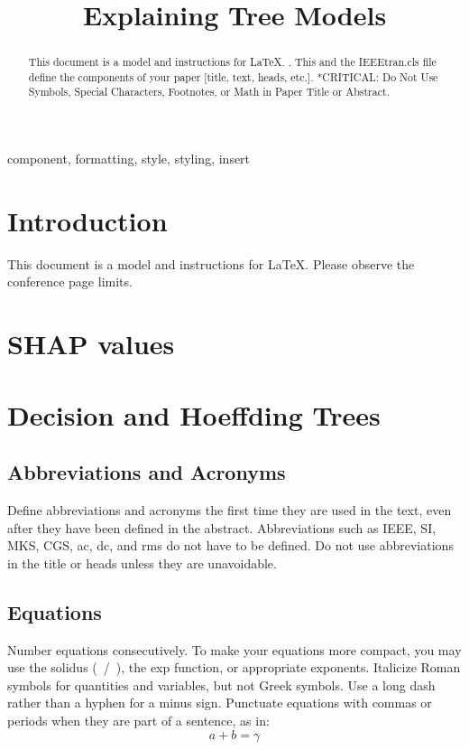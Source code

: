 \documentclass[conference]{IEEEtran}
\begin{document}
\title{Explaining Tree Models}

\author{
}

\maketitle

\begin{abstract}
This document is a model and instructions for \LaTeX.
\cite{b1}. This \cite{b2} and \cite{b3} the IEEEtran.cls file define the components of your paper [title, text, heads, etc.]. *CRITICAL: Do Not Use Symbols, Special Characters, Footnotes, 
or Math in Paper Title or Abstract.
\end{abstract}

\begin{IEEEkeywords}
component, formatting, style, styling, insert
\end{IEEEkeywords}

\section{Introduction}
This document is a model and instructions for \LaTeX.
Please observe the conference page limits. 

\section{SHAP values}

\section{Decision and Hoeffding Trees}

\subsection{Abbreviations and Acronyms}\label{AA}
Define abbreviations and acronyms the first time they are used in the text, 
even after they have been defined in the abstract. Abbreviations such as 
IEEE, SI, MKS, CGS, ac, dc, and rms do not have to be defined. Do not use 
abbreviations in the title or heads unless they are unavoidable.

\subsection{Equations}
Number equations consecutively. To make your 
equations more compact, you may use the solidus (~/~), the exp function, or 
appropriate exponents. Italicize Roman symbols for quantities and variables, 
but not Greek symbols. Use a long dash rather than a hyphen for a minus 
sign. Punctuate equations with commas or periods when they are part of a 
sentence, as in:
\begin{equation}
a+b=\gamma\label{eq}
\end{equation}
\end{document}

